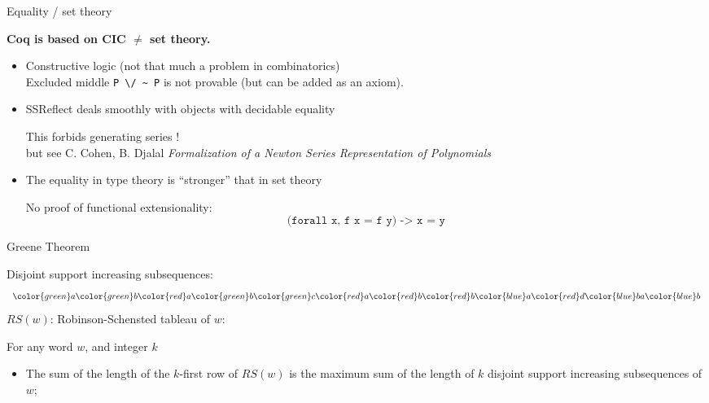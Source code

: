 \documentclass[compress,11pt]{beamer}
\newcommand{\red}[1]{{\color{red} #1}}
\newcommand{\grn}[1]{{\color{green} #1}}
\newcommand{\blu}[1]{{\color{blue} #1}}
\begin{document}
\begin{frame}[fragile]{Equality / set theory}

  \textbf{\Large Coq is based on CIC $\neq$ set theory.}\bigskip

  \begin{itemize}
  \item Constructive logic (not that much a problem in combinatorics)\\
    Excluded middle \verb|P \/ ~ P| is not provable (but can be added as an
    axiom). \bigskip

  \item SSReflect deals smoothly with objects with decidable equality 
    \medskip

    This forbids generating series ! \\

    but see C. Cohen, B. Djalal
    \emph{Formalization of a Newton Series Representation of Polynomials}
    \bigskip

  \item The equality in type theory is ``stronger'' that in set theory

    No proof of functional extensionality:\\
    \[\texttt{(forall x, f x = f y) -> x = y}\]
  \end{itemize}
\end{frame}

\begin{frame}[fragile]{Greene Theorem}

  Disjoint support increasing subsequences:
  \[
  \begin{array}{c@{}c@{}c@{}c@{}c@{}c@{}c@{}c@{}c@{}c@{}c@{}c@{}c}
    \grn{a}&\grn{b}&\red{a}&\grn{b}&\grn{c}&\red a&\red b&\red b&\blu{a}&\red d&\blu{b}&a&\blu{b}
  \end{array}
  \]
  $RS(w)$: Robinson-Schensted tableau of $w$:
  \pause
  \begin{THEO}
    For any word $w$, and integer $k$
    \begin{itemize}
    \item The sum of the length of the $k$-first row of $RS(w)$ is the maximum
      sum of the length of $k$ disjoint support increasing subsequences of $w$;
    \end{itemize}
  \end{THEO}
\end{frame}
\end{document}
